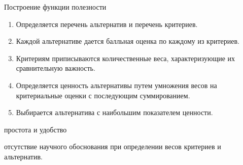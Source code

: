 \documentclass[unicode,11pt,notheorems,xcolor=table]{beamer}
\begin{document}
\begin{frame}[allowframebreaks]{Построение функции полезности}{}
    \begin{enumerate}
        \item Определяется перечень альтернатив и перечень критериев.
        \item Каждой альтернативе дается балльная оценка по каждому из критериев.
        \item Критериям приписываются количественные веса, характеризующие их сравнительную важность. 
        \item Определяется ценность альтернативы путем умножения весов на критериальные оценки с последующим суммированием. 
        \item Выбирается альтернатива с наибольшим показателем ценности. 
    \end{enumerate}
    
    \bigskip
    простота и удобство
        
    \bigskip
    отсутствие научного обоснования при определении весов критериев и альтернатив.                 
\end{frame}
    
\end{document}
